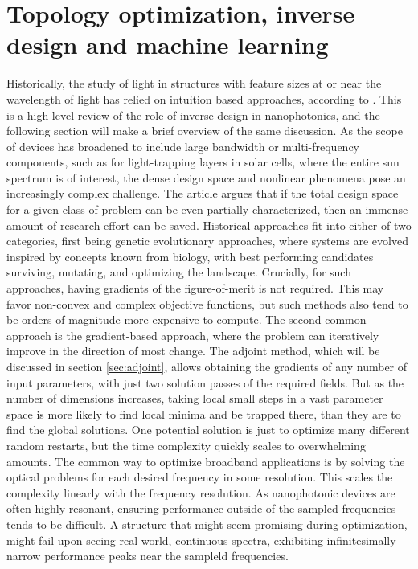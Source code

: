 \section{Topology optimization, inverse design and machine learning}
Historically, the study of light in structures with feature sizes at or near the wavelength of light has 
relied on intuition based approaches, according to \cite{Molesky2018}. This is a high level review of the role of inverse design in nanophotonics, and the following section will make a brief overview of the same discussion. 
As the scope of devices has broadened to include
large bandwidth or multi-frequency components, such as for light-trapping layers in solar cells, where the entire sun spectrum is of interest, the dense design space and nonlinear
phenomena pose an increasingly complex challenge. The article argues that if the total design space for a given class of problem can be even partially characterized,
then an immense amount of research effort can be saved. Historical approaches fit into either of two categories, first being genetic evolutionary approaches, where systems are evolved inspired by 
concepts known from biology, with best performing candidates surviving, mutating, and optimizing the landscape. Crucially, for such approaches, having gradients of the figure-of-merit is not required.
This may favor non-convex and complex objective functions, but such methods also tend to be orders of magnitude more expensive to compute.
The second common approach is the gradient-based approach, where the problem can iteratively improve in the direction of most change. The adjoint method, which will be discussed in section \ref{sec:adjoint},
allows obtaining the gradients of any number of input parameters, with just two solution passes of the required fields. But as the number of dimensions increases, taking local small steps in a vast parameter space is more likely
to find local minima and be trapped there, than they are to find the global solutions. One potential solution is just to optimize many different random restarts, but the time complexity quickly scales to overwhelming amounts.
The common way to optimize broadband applications is by solving the optical problems for each desired frequency in some resolution. This scales the complexity linearly with the frequency resolution.
As nanophotonic devices are often highly resonant, ensuring performance outside of the sampled frequencies tends to be difficult. A structure that might seem promising during optimization, might fail upon seeing real world, continuous spectra, exhibiting infinitesimally narrow performance
peaks near the sampleld frequencies.

